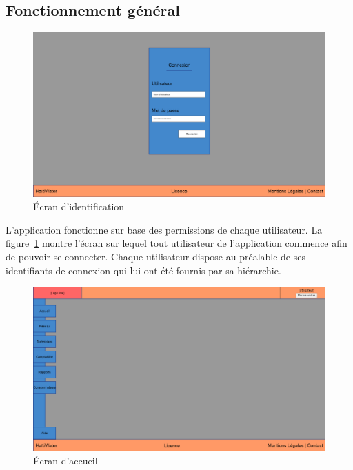 \documentclass[a4paper, 11pt]{article}
\begin{document}
  \subsection{Fonctionnement général}
    \begin{figure}[H]
        \includegraphics[width=\textwidth]{Cahier_des_Charges/login}
        \caption{\'Ecran d'identification}
        \label{fig:login}
    \end{figure}

    L'application fonctionne sur base des permissions de chaque utilisateur. La figure~\ref{fig:login} montre l'écran sur lequel tout utilisateur de l'application commence afin de pouvoir se connecter. Chaque utilisateur dispose au préalable de ses identifiants de connexion qui lui ont été fournis par sa hiérarchie.

    \begin{figure}[H]
        \includegraphics[width=\textwidth]{Cahier_des_Charges/accueil} %
        \caption{\'Ecran d'accueil}
        \label{fig:dashboard}
    \end{figure}
\end{document}

